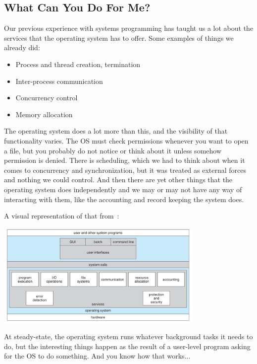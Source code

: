 \subsection*{What Can You Do For Me?}

Our previous experience with systems programming has taught us a lot about the services that the operating system has to offer. Some examples of things we already did:
\begin{multicols}{2}
\begin{itemize}
	\item Process and thread creation, termination
	\item Inter-process communication
	\item Concurrency control
	\item Memory allocation
\end{itemize}
\end{multicols}

The operating system does a lot more than this, and the visibility of that functionality varies. The OS must check permissions whenever you want to open a file, but you probably do not notice or think about it unless somehow permission is denied. There is scheduling, which we had to think about when it comes to concurrency and synchronization, but it was treated as external forces and nothing we could control. And then there are yet other things that the operating system does independently and we may or may not have any way of interacting with them, like the accounting and record keeping the system does.

A visual representation of that from~\cite{osc}:
\begin{center}
	\includegraphics[width=0.75\textwidth]{images/os-structure.png}
\end{center}

At steady-state, the operating system runs whatever background tasks it needs to do, but the interesting things happen as the result of a user-level program asking for the OS to do something. And you know how that works...

